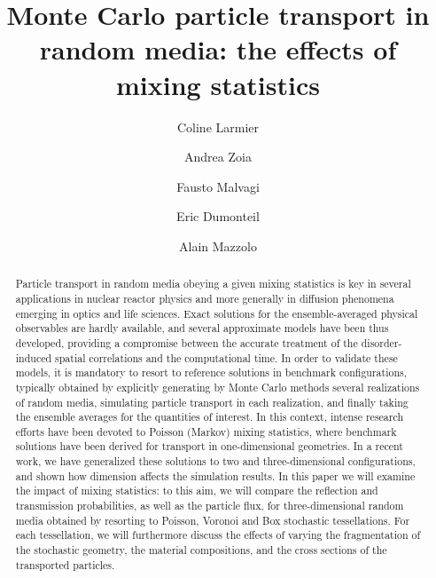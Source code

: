 \documentclass[final,authoryear,5p,times,twocolumn]{elsarticle}
\begin{document}
\begin{frontmatter}

\title{Monte Carlo particle transport in random media: the effects of mixing statistics}


\author[label1]{Coline Larmier}
\address[label1]{Den-Service d'Etudes des R\'eacteurs et de Math\'ematiques Appliqu\'ees (SERMA), CEA, Universit\'e Paris-Saclay, 91191 Gif-sur-Yvette, FRANCE.}
\author[label1]{Andrea Zoia}
\author[label1]{Fausto Malvagi}
\author[label2]{Eric Dumonteil}
\address[label2]{IRSN, 31 Avenue de la Division Leclerc, 92260 Fontenay aux Roses, FRANCE.}
\author[label1]{Alain Mazzolo}





\begin{abstract}
Particle transport in random media obeying a given mixing statistics is key in several applications in nuclear reactor physics and more generally in diffusion phenomena emerging in optics and life sciences. Exact solutions for the ensemble-averaged physical observables are hardly available, and several approximate models have been thus developed, providing a compromise between the accurate treatment of the disorder-induced spatial correlations and the computational time. In order to validate these models, it is mandatory to resort to reference solutions in benchmark configurations, typically obtained by explicitly generating by Monte Carlo methods several realizations of random media, simulating particle transport in each realization, and finally taking the ensemble averages for the quantities of interest. In this context, intense research efforts have been devoted to Poisson (Markov) mixing statistics, where benchmark solutions have been derived for transport in one-dimensional geometries. In a recent work, we have generalized these solutions to two and three-dimensional configurations, and shown how dimension affects the simulation results. In this paper we will examine the impact of mixing statistics: to this aim, we will compare the reflection and transmission probabilities, as well as the particle flux, for three-dimensional random media obtained by resorting to Poisson, Voronoi and Box stochastic tessellations. For each tessellation, we will furthermore discuss the effects of varying the fragmentation of the stochastic geometry, the material compositions, and the cross sections of the transported particles.
\end{abstract}


\end{frontmatter}
\end{document}
